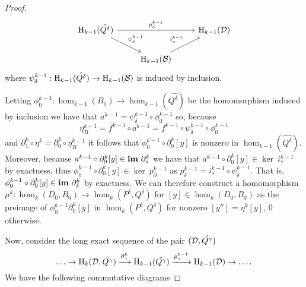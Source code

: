 \begin{proof}
  \begin{equation}\label{eq:main1}\begin{tikzcd}
      \hom_{k-1}(\hat{Q^\delta})\arrow{dr}{\psi_\delta^{k-1}}\arrow{rr}{p_\delta^{k-1}} & &
      \hom_{k-1}(\D)\\
    & \hom_{k-1}(\B)\arrow{ur}{i_*^{k-1}}
  \end{tikzcd}\end{equation}
  where $\psi_\delta^{k-1} : \mathrm{H}_{k-1}(\hat{Q^\delta})\to \mathrm{H}_{k-1}({\mathcal{B}})$ is induced by inclusion.

  Letting $\phi_0^{k-1} : \hom_{k-1}(B_0)\to\hom_{k-1}(\hat{Q^\delta})$ be the homomorphism induced by inclusion we have that $a^{k-1} = \psi_\delta^{k-1}\circ\phi_0^{k-1}$ so, because
  \[\eta_B^{k-1} = f^{k-1}\circ a^{k-1} = f^{k-1}\circ \psi_\delta^{k-1}\circ\phi_0^{k-1}\]
  and $\partial_1^k\circ\eta^k = \partial_0^k\circ \eta_B^{k-1}$ it follows that $\phi_0^{k-1}\circ\partial_0^k[y]$ is nonzero in $\hom_{k-1}(\hat{Q^\delta})$.
  Moreover, because $a^{k-1}\circ\partial_0^k[y]\in\mathbf{im}~\partial_*^k$ we have that $a^{k-1}\circ\partial_0^k[y]\in\ker~i_*^{k-1}$ by exactness, thus
  $\phi_0^{k-1}\circ\partial_0^k[y]\in \ker~p_\partial^{k-1}$ as $p_\delta^{k-1} = i_*^{k-1}\circ\psi_\delta^{k-1}$.
  That is, $\phi_0^{k-1}\circ\partial_0^k[y]\in \mathbf{im}~\partial_\delta^{k}$ by exactness.
  We can therefore construct a homomorphism $\mu^k : \hom_k(D_0, B_0) \to \hom_k(P^\delta, Q^\delta)$ for $[y]\in \hom_k(D_0, B_0)$ as the preimage of $\phi_0^{k-1}\partial_0^k[y]$ in $\hom_k(P^\delta, Q^\delta)$ for nonzero $[y''] = \eta^k[y]$, $0$ otherwise.


  Now, consider the long exact sequence of the pair $({\mathcal{D}}, \hat{Q^\gamma})$
  \[\ldots\to\mathrm{H}_k({\mathcal{D}}, \hat{Q^\gamma})\xrightarrow{\partial^k_\gamma}
    \mathrm{H}_{k-1}(\hat{Q^\gamma})\xrightarrow{p^{k-1}_\gamma}
    \mathrm{H}_{k-1}({\mathcal{D}})\to\ldots.\]
  We have the following commutative diagrams


\end{proof}
